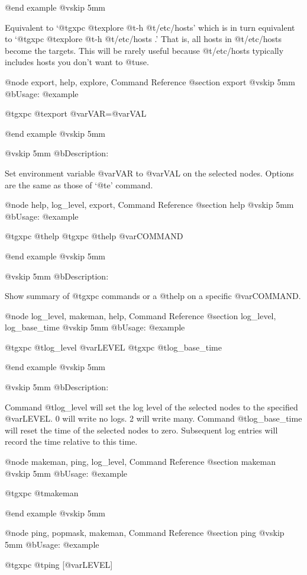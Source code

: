 @end example
@vskip 5mm

Equivalent to `@t{gxpc} @t{explore} @t{-h} @t{/etc/hosts}' which is in turn
equivalent to `@t{gxpc} @t{explore} @t{-h} @t{/etc/hosts} .'  That is, all hosts
in @t{/etc/hosts} become the targets.  This will be rarely useful
because @t{/etc/hosts} typically includes hosts you don't want to
@t{use}.

@node export, help, explore, Command Reference
@section export
@vskip 5mm
@b{Usage:}
@example

  @t{gxpc} @t{export} @var{VAR}=@var{VAL}

@end example
@vskip 5mm

@vskip 5mm
@b{Description:}


  Set environment variable @var{VAR} to @var{VAL} on the selected nodes.
Options are the same as those of `@t{e}' command.

@node help, log_level, export, Command Reference
@section help
@vskip 5mm
@b{Usage:}
@example

  @t{gxpc} @t{help}
  @t{gxpc} @t{help} @var{COMMAND}

@end example
@vskip 5mm

@vskip 5mm
@b{Description:}


  Show summary of @t{gxpc} commands or a @t{help} on a specific @var{COMMAND}.

@node log_level, makeman, help, Command Reference
@section log_level, log_base_time
@vskip 5mm
@b{Usage:}
@example

  @t{gxpc} @t{log_level} @var{LEVEL}
  @t{gxpc} @t{log_base_time}

@end example
@vskip 5mm

@vskip 5mm
@b{Description:}


  Command @t{log_level} will set the log level of the selected nodes
to the specified @var{LEVEL}.  0 will write no logs. 2 will write many.
Command @t{log_base_time} will reset the time of the selected nodes
to zero.  Subsequent log entries will record the time relative to
this time.

@node makeman, ping, log_level, Command Reference
@section makeman
@vskip 5mm
@b{Usage:}
@example

  @t{gxpc} @t{makeman}

@end example
@vskip 5mm

@node ping, popmask, makeman, Command Reference
@section ping
@vskip 5mm
@b{Usage:}
@example

  @t{gxpc} @t{ping} [@var{LEVEL}]

